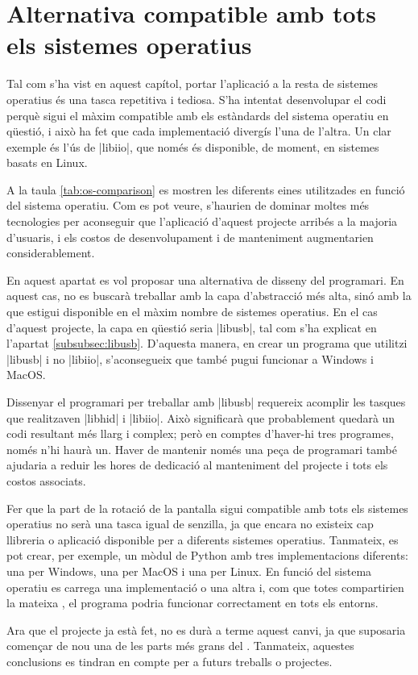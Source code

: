 \section{Alternativa compatible amb tots els sistemes operatius}
\label{sec:winmac-conclusions}

Tal com s'ha vist en aquest capítol, portar l'aplicació a la resta de sistemes
operatius és una tasca repetitiva i tediosa. S'ha intentat desenvolupar el codi
perquè sigui el màxim compatible amb els estàndards del sistema operatiu en
qüestió, i això ha fet que cada implementació divergís l'una de l'altra. Un clar
exemple és l'ús de \ord|libiio|, que només és disponible, de moment, en sistemes
basats en Linux.

A la taula \ref{tab:os-comparison} es mostren les diferents eines
utilitzades en funció del sistema operatiu. Com es pot veure, s'haurien de dominar
moltes més tecnologies per aconseguir que l'aplicació d'aquest projecte arribés
a la majoria d'usuaris, i els costos de desenvolupament i de manteniment
augmentarien considerablement.



En aquest apartat es vol proposar una alternativa de disseny del programari. En
aquest cas, no es buscarà treballar amb la capa d'abstracció més alta, sinó amb
la que estigui disponible en el màxim nombre de sistemes operatius. En el cas
d'aquest projecte, la capa en qüestió seria \ord|libusb|, tal com s'ha explicat
en l'apartat \ref{subsubsec:libusb}. D'aquesta manera, en crear un programa que
utilitzi \ord|libusb| i no \ord|libiio|, s'aconsegueix que també pugui funcionar
a Windows i MacOS.

Dissenyar el programari per treballar amb \ord|libusb| requereix acomplir
les tasques que realitzaven \ord|libhid| i \ord|libiio|. Això significarà que
probablement quedarà un codi resultant més llarg i complex; però en comptes d'haver-hi
tres programes, només n'hi haurà un. Haver de mantenir només una peça de programari
també ajudaria a reduir les hores de dedicació al manteniment del projecte i
tots els costos associats.

Fer que la part de la rotació de la pantalla sigui compatible amb tots els sistemes
operatius no serà una tasca igual de senzilla, ja que encara no existeix cap
llibreria o aplicació disponible per a diferents sistemes operatius. Tanmateix,
es pot crear, per exemple, un mòdul de Python amb tres implementacions
diferents: una per Windows, una per MacOS i una per Linux. En funció del
sistema operatiu es carrega una implementació o una altra i, com que totes
compartirien la mateixa , el programa podria funcionar correctament en
tots els entorns.

Ara que el projecte ja està fet, no es durà a terme aquest canvi, ja que suposaria
començar de nou una de les parts més grans del . Tanmateix, aquestes
conclusions es tindran en compte per a futurs treballs o projectes.
